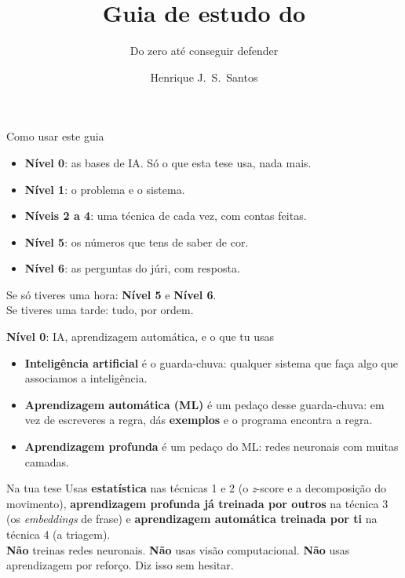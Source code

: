 \documentclass[aspectratio=169]{beamer}
\title[Guia de estudo]{Guia de estudo do \gator}
\subtitle{Do zero até conseguir defender}
\author{Henrique J.\ S.\ Santos}
\date{}
\newcommand{\key}[1]{\textbf{\textcolor{blue!55!black}{#1}}}
\begin{document}
\begin{frame}\titlepage\end{frame}

\begin{frame}{Como usar este guia}
\begin{itemize}
  \item \key{Nível 0}: as bases de IA. Só o que esta tese usa, nada mais.
  \item \key{Nível 1}: o problema e o sistema.
  \item \key{Níveis 2 a 4}: uma técnica de cada vez, com contas feitas.
  \item \key{Nível 5}: os números que tens de saber de cor.
  \item \key{Nível 6}: as perguntas do júri, com resposta.
\end{itemize}
\vspace{4mm}
\begin{center}
Se só tiveres uma hora: \key{Nível 5} e \key{Nível 6}.\\
Se tiveres uma tarde: tudo, por ordem.
\end{center}
\end{frame}

\begin{frame}{\key{Nível 0}: IA, aprendizagem automática, e o que tu usas}
\begin{itemize}
  \item \key{Inteligência artificial} é o guarda-chuva: qualquer sistema que faça algo que
        associamos a inteligência.
  \item \key{Aprendizagem automática (ML)} é um pedaço desse guarda-chuva: em vez de escreveres a
        regra, dás \textbf{exemplos} e o programa encontra a regra.
  \item \key{Aprendizagem profunda} é um pedaço do ML: redes neuronais com muitas camadas.
\end{itemize}
\vspace{4mm}
\begin{block}{Na tua tese}
Usas \textbf{estatística} nas técnicas 1 e 2 (o \emph{z}-score e a decomposição do movimento),
\textbf{aprendizagem profunda já treinada por outros} na técnica 3 (os \emph{embeddings} de frase)
e \textbf{aprendizagem automática treinada por ti} na técnica 4 (a triagem).\\
\textbf{Não} treinas redes neuronais. \textbf{Não} usas visão computacional. \textbf{Não} usas
aprendizagem por reforço. Diz isso sem hesitar.
\end{block}
\end{frame}
\end{document}
